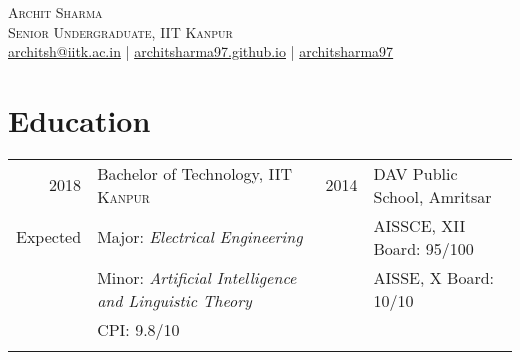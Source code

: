 \documentclass[a4paper,10pt]{article}
\begin{document}

\pagestyle{empty} %


\par{\centering
		{\hspace{-2mm}\Huge \textsc{Archit Sharma}
	}\\\large \textsc{Senior Undergraduate, IIT Kanpur}\\\normalsize \Letter\hspace{1mm}\href{mailto:architsh@iitk.ac.in}{architsh@iitk.ac.in} | \Mundus\hspace{1mm}\href{https://architsharma97.github.io/}{ architsharma97.github.io} | \faGithub \hspace{0mm} \href{https://github.com/architsharma97/}{architsharma97} \par}
	
\section{Education}
\begin{tabular}{rl|rl}	
\textsc{2018} & \large Bachelor of Technology, \textsc{IIT Kanpur} & \textsc{2014} & \large DAV Public School, Amritsar \\
Expected & {Major}: \textit{Electrical Engineering} & & AISSCE, XII Board: 95/100\\
         & {Minor}: \textit{Artificial Intelligence and Linguistic Theory}& & AISSE, X Board: 10/10\\ 
         & {CPI}: \textsc{9.8/10} \\
         & \\
\end{tabular}
\end{document}
